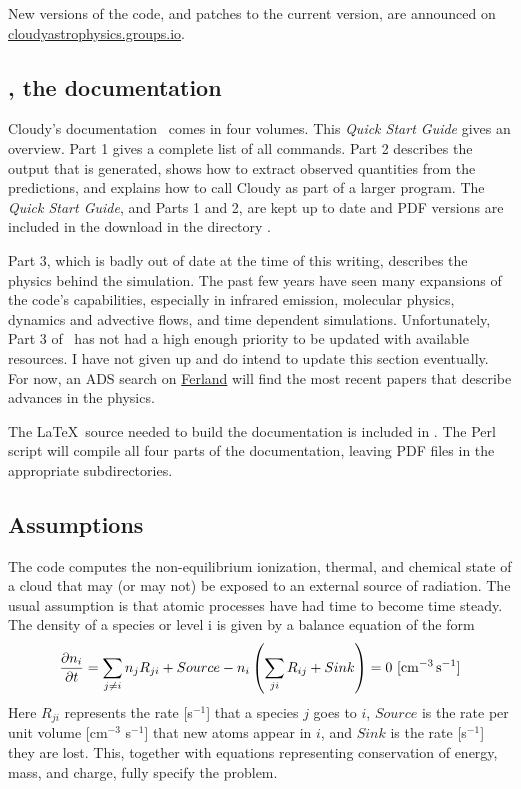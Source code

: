 \documentclass[12pt,twoside]{article}
\begin{document}
New versions of the code, and patches to the current version, are
announced on  
\href{https://cloudyastrophysics.groups.io}{cloudyastrophysics.groups.io}.

\subsection{\Hazy, the documentation}

Cloudy's documentation \Hazy\ comes in four volumes.
This \emph{Quick Start Guide} gives an overview.
Part 1 gives a complete list of all commands.
Part 2 describes the output that is generated, shows how to extract
observed quantities from the predictions, and explains how to call Cloudy
as part of a larger program.  
The \emph{Quick Start Guide}, and Parts 1 and 2, are kept up to date and PDF versions are included
in the download in the directory .

Part 3, which is badly out of date at the time of this writing, describes
the physics behind the simulation.  The past few years have seen many
expansions of the code's capabilities, especially in infrared emission,
molecular physics, dynamics and advective flows,
and time dependent simulations.
Unfortunately, Part 3 of \Hazy\ has not had a high enough
priority to be updated with available resources.  I have not given up and
do intend to update this section eventually.  For now, an ADS search on
\href{http://adsabs.harvard.edu/cgi-bin/abs_connect?author=ferland\%2C+g&amp;return_req=no_params}{Ferland} will find the most recent papers that describe advances in the
physics.

The \LaTeX\ source needed to build the documentation is included in .
The Perl script  will compile all four parts of the documentation,
leaving PDF files in the appropriate subdirectories.

\subsection{Assumptions}

The code computes the non-equilibrium ionization, thermal, and chemical
state of a cloud that may (or may not) be exposed to an external source
of radiation.  The usual assumption is that atomic processes have had time
to become time steady.  The density of a species or level i is given by
a balance equation of the form
\begin{equation}
\frac{\partial n_i}{\partial t} = \sum_{j \ne i} n_j R_{ji} +
  Source - n_i \left( \sum_{ji} R_{ij}  + Sink \right) = 0
  \ \rm{[cm^{-3} \, s^{-1}]}
\end{equation}
Here $R_{ji}$ represents the rate [s$^{-1}$] that a species $j$ goes to $i$,
$Source$ is
the rate per unit volume [cm$^{-3}$ s$^{-1}$]
that new atoms appear in $i$, and $Sink$
is the rate [s$^{-1}$] they are lost.  This,
together with equations representing
conservation of energy, mass, and charge, fully specify the problem.
\end{document}
